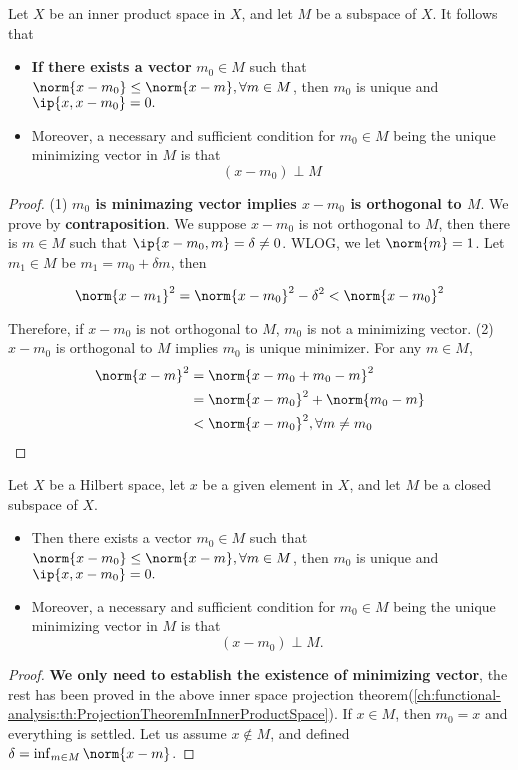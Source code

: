 \begin{refsection}
\begin{theorem}\label{ch:functional-analysis:th:ProjectionTheoremInInnerProductSpace}
	\cite[50]{luenberger1969optimization}
	Let $X$ be an inner product space in $X$, and let $M$ be a subspace of $X$. 
	It follows that
	\begin{itemize}
		\item \textbf{If there exists a vector} $m_0\in M$ such that $\norm{x-m_0} \leq \norm{x-m},\forall m\in M$, then $m_0$ is unique and $\ip{x,x-m_0} = 0.$ 
		\item Moreover, a necessary and sufficient condition for $m_0\in M$ being the unique minimizing vector in $M$ is that $$(x-m_0)\perp M$$
	\end{itemize}
\end{theorem}
\begin{proof}
 (1) \textbf{$m_0$ is minimazing vector implies $x-m_0$ is orthogonal to $M$}. We prove by \textbf{contraposition}. We suppose $x-m_0$ is not orthogonal to $M$, then there is $m\in M$ such that $\ip{x-m_0,m}=\delta \neq 0$. WLOG, we let $\norm{m} = 1$. Let $m_1\in M$ be $m_1 = m_0 + \delta m$, then

$$\norm{x-m_1}^2 = \norm{x-m_0}^2 - \delta^2 < \norm{x-m_0}^2$$

Therefore, if $x-m_0$ is not orthogonal to $M$, $m_0$ is not a minimizing vector.
(2) $x-m_0$ is orthogonal to $M$ implies $m_0$ is unique minimizer. For any $m\in M$,
\begin{align*}
\norm{x-m}^2 &= \norm{x-m_0 + m_0 - m}^2 \\
& = \norm{x-m_0}^2 + \norm{m_0 - m} \\
& < \norm{x-m_0}^2, \forall m\neq m_0
\end{align*}	
\end{proof}

\begin{theorem}\label{ch:functional-analysis:th:ProjectionTheoreInHilbertSpace}
	\cite[51]{luenberger1969optimization} \cite[67]{christensen2010functions}
	Let $X$ be a Hilbert space, let $x$ be a given element in $X$, and let $M$ be a closed subspace of $X$. 
	\begin{itemize}
		\item Then there exists a vector $m_0\in M$ such that $\norm{x-m_0} \leq \norm{x-m},\forall m\in M$, then $m_0$ is unique and $\ip{x,x-m_0} = 0.$
		\item 	Moreover, a necessary and sufficient condition for $m_0\in M$ being the unique minimizing vector in $M$ is that $$(x-m_0)\perp M.$$
	\end{itemize}
\end{theorem}
\begin{proof}
	\textbf{We only need to establish the existence of minimizing vector}, the rest has been proved in the above inner space projection theorem(\autoref{ch:functional-analysis:th:ProjectionTheoremInInnerProductSpace}).
	If $x \in M$, then $m_0=x$ and everything is settled. Let us assume $x\notin M$, and defined $\delta = \inf_{m\in M}\norm{x-m}$.
	

\end{proof}
\end{refsection}
